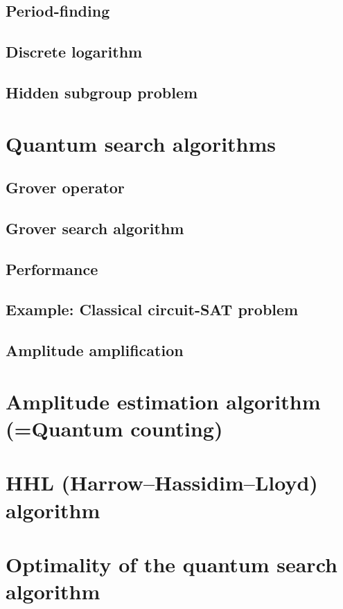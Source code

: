 \subsection{Period-finding}
\subsection{Discrete logarithm}
\subsection{Hidden subgroup problem}




\section{Quantum search algorithms}
\subsection{Grover operator}
\subsection{Grover search algorithm}
\subsection{Performance}

\subsection{Example: Classical circuit-SAT problem}
\subsection{Amplitude amplification}

\section{Amplitude estimation algorithm (=Quantum counting)}

\section{HHL (Harrow–Hassidim–Lloyd) algorithm}

\section{Optimality of the quantum search algorithm}